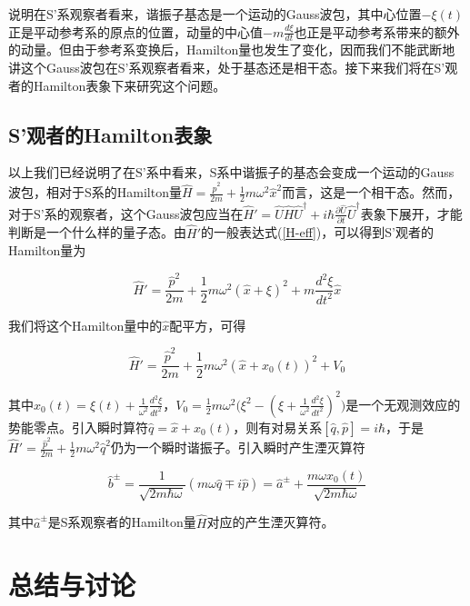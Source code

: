 \documentclass[a4paper]{article}
\begin{document}
        说明在S'系观察者看来，谐振子基态是一个运动的Gauss波包，其中心位置$-\xi(t)$正是平动参考系的原点的位置，动量的中心值$-m\frac{d\xi}{dt}$也正是平动参考系带来的额外的动量。但由于参考系变换后，Hamilton量也发生了变化，因而我们不能武断地讲这个Gauss波包在S'系观察者看来，处于基态还是相干态。接下来我们将在S'观者的Hamilton表象下来研究这个问题。

    \subsection{S'观者的Hamilton表象}

        以上我们已经说明了在S'系中看来，S系中谐振子的基态会变成一个运动的Gauss波包，相对于S系的Hamilton量$\hat{H}=\frac{\hat{p}^2}{2m}+\frac{1}{2}m\omega^2\hat{x}^2$而言，这是一个相干态。然而，对于S'系的观察者，这个Gauss波包应当在$\hat{H}'=\hat{U}\hat{H}\hat{U}^\dagger+i\hbar\frac{\partial\hat{U}}{\partial t}\hat{U}^\dagger$表象下展开，才能判断是一个什么样的量子态。由$\hat{H}'$的一般表达式(\ref{H-eff})，可以得到S'观者的Hamilton量为

        \begin{equation}
            \hat{H}'=\frac{\hat{p}^2}{2m}+\frac{1}{2}m\omega^2(\hat{x}+\xi)^2+m\frac{d^2\xi}{dt^2}\hat{x}
        \end{equation}

        我们将这个Hamilton量中的$\hat{x}$配平方，可得

        \begin{equation}
            \hat{H}'=\frac{\hat{p}^2}{2m}+\frac{1}{2}m\omega^2(\hat{x}+x_0(t))^2+V_0
        \end{equation}

        其中$x_0(t)=\xi(t)+\frac{1}{\omega^2}\frac{d^2\xi}{dt^2}$，$V_0=\frac{1}{2}m\omega^2\bigl(\xi^2-(\xi+\frac{1}{\omega^2}\frac{d^2\xi}{dt^2})^2\bigr)$是一个无观测效应的势能零点。引入瞬时算符$\hat{q}=\hat{x}+x_0(t)$，则有对易关系$[\hat{q},\hat{p}]=i\hbar$，于是$\hat{H}'=\frac{\hat{p}^2}{2m}+\frac{1}{2}m\omega^2\hat{q}^2$仍为一个瞬时谐振子。引入瞬时产生湮灭算符

        \begin{equation}
            \hat{b}^\pm = \frac{1}{\sqrt{2m\hbar\omega}}(m\omega\hat{q}\mp i\hat{p}) = \hat{a}^\pm + \frac{m\omega x_0(t)}{\sqrt{2m\hbar\omega}}
        \end{equation}

        其中$\hat{a}^\pm$是S系观察者的Hamilton量$\hat{H}$对应的产生湮灭算符。



        
    \section{总结与讨论}




\begin{thebibliography}{9}
\end{thebibliography}
\end{document}
